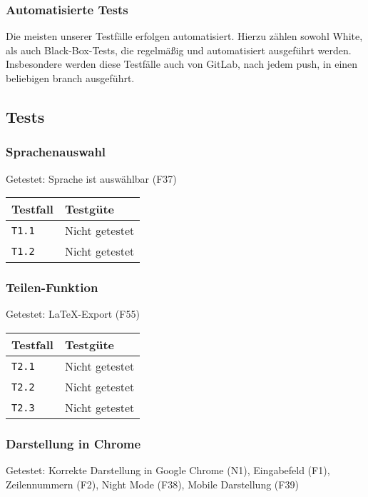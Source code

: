 \documentclass[parskip=full,11pt,twoside]{scrartcl}
\newcommand{\testline}[2]{
    \texttt{#1} & 
    \ifthenelse{\equal{#2}{Nicht getestet}}
        {\cellcolor{red!20}}
        {}
    \ifthenelse{\equal{#2}{Manuell getestet}}
        {\cellcolor{orange!20}}
        {}
    \ifthenelse{\equal{#2}{Automatisiert getestet}}
        {\cellcolor{green!20}}
        {}
    #2 \\ \hline
}
\begin{document}
\subsubsection{Automatisierte Tests}
Die meisten unserer Testfälle erfolgen automatisiert.
Hierzu zählen sowohl White, als auch Black-Box-Tests, die regelmäßig und automatisiert ausgeführt werden.
Insbesondere werden diese Testfälle auch von GitLab, nach jedem push, in einen beliebigen branch ausgeführt.

\subsection{Tests}

\subsubsection{Sprachenauswahl}
    Getestet:
    Sprache ist auswählbar (F37)

    \label{shortcuts}
    \begin{center}
        \begin{tabular}{ p{9cm} p{4cm}}
            Testfall & Testgüte \\ \hline
            \testline{T1.1}{Nicht getestet}
            \testline{T1.2}{Nicht getestet}
        \end{tabular}
    \end{center}

\subsubsection{Teilen-Funktion}
    Getestet:
    LaTeX-Export (F55)

    \label{shortcuts}
    \begin{center}
        \begin{tabular}{ p{9cm} p{4cm}}
            Testfall & Testgüte \\ \hline
            \testline{T2.1}{Nicht getestet}
            \testline{T2.2}{Nicht getestet}
            \testline{T2.3}{Nicht getestet}
        \end{tabular}
    \end{center}

\subsubsection{Darstellung in Chrome}
    Getestet:
    Korrekte Darstellung in Google Chrome (N1),
    Eingabefeld (F1),
    Zeilennummern (F2),
    Night Mode (F38),
    Mobile Darstellung (F39)
\end{document}
